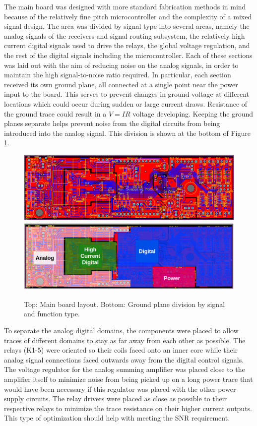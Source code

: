 \documentclass{article}
\begin{document}
	The main board was designed with more standard fabrication methods in mind because of the relatively fine pitch microcontroller and the complexity of a mixed signal design.  The area was divided by signal type into several areas, namely the analog signals of the receivers and signal routing subsystem, the relatively high current digital signals used to drive the relays, the global voltage regulation, and the rest of the digital signals including the microcontroller.  Each of these sections was laid out with the aim of reducing noise on the analog signals, in order to maintain the high signal-to-noise ratio required.  In particular, each section received its own ground plane, all connected at a single point near the power input to the board.  This serves to prevent changes in ground voltage at different locations which could occur during sudden or large current draws.  Resistance of the ground trace could result in a $V = IR$ voltage developing.  Keeping the ground planes separate helps prevent noise from the digital circuits from being introduced into the analog signal.  This division is shown at the bottom of Figure \ref{fig:PCBdivisions}.

	\begin{figure}
		\centering
		\includegraphics[width = \textwidth]{PR5Images/MainBoard2D.png}
		\includegraphics[width = \textwidth]{PR5Images/PCBDivision.png}
		\caption{Top: Main board layout.  Bottom: Ground plane division by signal and function type.}
		\label{fig:PCBdivisions}
	\end{figure}

	To separate the analog digital domains, the components were placed to allow traces of different domains to stay as far away from each other as possible.  The relays (K1-5) were oriented so their coils faced onto an inner core while their analog signal connections faced outwards away from the digital control signals.  The voltage regulator for the analog summing amplifier was placed close to the amplifier itself to minimize noise from being picked up on a long power trace that would have been necessary if this regulator was placed with the other power supply circuits.  The relay drivers were placed as close as possible to their respective relays to minimize the trace resistance on their higher current outputs.  This type of optimization should help with meeting the SNR requirement.
\end{document}
